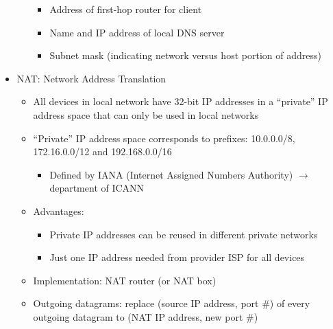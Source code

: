 \begin{itemize}
\begin{itemize}
        \begin{itemize}

          \item Address of first-hop router for client

          \item Name and IP address of local DNS server

          \item Subnet mask (indicating network versus host portion of address)

        \end{itemize}

    \end{itemize}

  \item NAT: Network Address Translation

    \begin{itemize}

      \item All devices in local network have 32-bit IP addresses in a ``private'' IP address space that can only be used in local networks

      \item ``Private'' IP address space corresponds to prefixes: 10.0.0.0/8, 172.16.0.0/12 and 192.168.0.0/16

        \begin{itemize}

          \item Defined by IANA (Internet Assigned Numbers Authority) $\to$ department of ICANN

        \end{itemize}

      \item Advantages:

        \begin{itemize}

          \item Private IP addresses can be reused in different private networks

          \item Just one IP address needed from provider ISP for all devices

        \end{itemize}

      \item Implementation: NAT router (or NAT box)

      \item Outgoing datagrams: replace (source IP address, port \#) of every outgoing datagram to (NAT IP address, new port \#)


\end{itemize}
\end{itemize}
